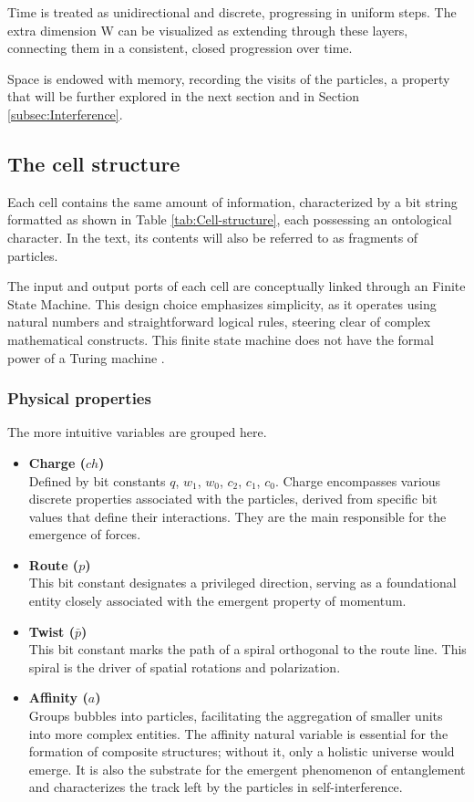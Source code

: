 \documentclass[12pt,english]{article}
\begin{document}
Time is treated as unidirectional and discrete, progressing in uniform steps. The extra dimension W can be visualized as extending through these layers, connecting them in a consistent, closed progression over time.

Space is endowed with memory, recording the visits of the particles, a property that will be further explored in the next section and in Section \ref{subsec:Interference}.

\subsection{The cell structure \label{subsec:The-cell-structure}}

Each cell contains the same amount of information, characterized by a bit string formatted as shown in Table \ref{tab:Cell-structure}, each possessing an ontological character. In the text, its contents will also be referred to as fragments of particles.

The input and output ports of each cell are conceptually linked through an Finite State Machine. This design choice emphasizes simplicity, as it operates using natural numbers and straightforward logical rules, steering clear of complex mathematical constructs. This finite state machine does not have the formal power of a Turing machine \cite{turing}.

\subsubsection{Physical properties}
The more intuitive variables are grouped here.
\begin{itemize}
    \item \textbf{Charge ($ch$)} \\
Defined by bit constants $q$, $w_{1}$, $w_{0}$, $c_{2}$, $c_{1}$, $c_{0}$.
Charge encompasses various discrete properties associated with the particles, derived from specific bit values that define their interactions. They are the main responsible for the emergence of forces.

\item \textbf{Route ($p$)} \\
This bit constant designates a privileged direction, serving as a foundational entity closely associated with the emergent property of momentum.

\item \textbf{Twist ($\bar{p}$)} \\
This bit constant marks the path of a spiral orthogonal to the route line. This spiral is the driver of spatial rotations and polarization.

\item \textbf{Affinity ($a$)} \\
    Groups bubbles into particles, facilitating the aggregation of smaller units into more complex entities. The affinity natural variable is essential for the formation of composite structures; without it, only a holistic universe would emerge. It is also the substrate for the emergent phenomenon of entanglement and characterizes the track left by the particles in self-interference.
\end{itemize}
\end{document}
